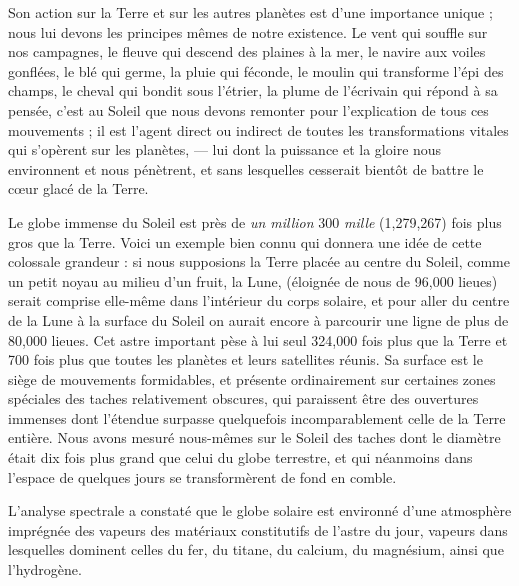 \documentclass[a4paper, 11pt, oneside, landscape]{article}
\begin{document}
Son action sur la Terre et sur les autres planètes est d'une importance unique ; nous lui devons les principes mêmes de notre existence. Le vent qui souffle sur nos campagnes, le fleuve qui descend des plaines à la mer, le navire aux voiles gonflées, le blé qui germe, la pluie qui féconde, le moulin qui transforme l'épi des champs, le cheval qui bondit sous l'étrier, la plume de l'écrivain qui répond à sa pensée, c'est au Soleil que nous devons remonter pour l'explication de tous ces mouvements ; il est l'agent direct ou indirect de toutes les transformations vitales qui s'opèrent sur les planètes, --- lui dont la puissance et la gloire nous environnent et nous pénètrent, et sans lesquelles cesserait bientôt de battre le cœur glacé de la Terre.

Le globe immense du Soleil est près de \emph{un million} 300 \emph{mille} (1,279,267) fois plus gros que la Terre. Voici un exemple bien connu qui donnera une idée de cette colossale grandeur : si nous supposions la Terre placée au centre du Soleil, comme un petit noyau au milieu d'un fruit, la Lune, (éloignée de nous de 96,000 lieues) serait comprise elle-même dans l'intérieur du corps solaire, et pour aller du centre de la Lune à la surface du Soleil on aurait encore à parcourir une ligne de plus de 80,000 lieues. Cet astre important pèse à lui seul 324,000 fois plus que la Terre et 700 fois plus que toutes les planètes et leurs satellites réunis. Sa surface est le siège de mouvements formidables, et présente ordinairement sur certaines zones spéciales des taches relativement obscures, qui paraissent être des ouvertures immenses dont l'étendue surpasse quelquefois incomparablement celle de la Terre entière. Nous avons mesuré nous-mêmes sur le Soleil des taches dont le diamètre était dix fois plus grand que celui du globe terrestre, et qui néanmoins dans l'espace de quelques jours se transformèrent de fond en comble.

L'analyse spectrale a constaté que le globe solaire est environné d'une atmosphère imprégnée des vapeurs des matériaux constitutifs de l'astre du jour, vapeurs dans lesquelles dominent celles du fer, du titane, du calcium, du magnésium, ainsi que l'hydrogène.
\end{document}
